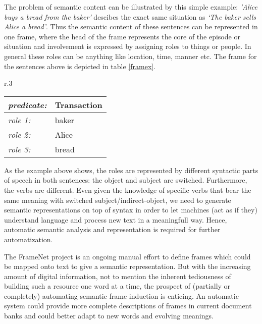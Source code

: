 \documentclass{article} %
\begin{document}
The problem of semantic content can be illustrated by this simple example: \textit{'Alice buys a bread from the baker'} descibes the exact same situation as \textit{`The baker sells Alice a bread'}. Thus the semantic content of these sentences can be represented in one frame, where the head of the frame represents the core of the episode or situation and involvement is expressed by assigning roles to things or people. In general these roles can be anything like location, time, manner etc. The frame for the sentences above is depicted in table \ref{framex}.
\begin{wraptable}{r}{.3\textwidth}
  \centering
\begin{tabular}{|l l|}
  \hline
  \textit{\small predicate:\normalsize}&Transaction\\
  \hline
  \hline
  \textit{\small role 1:\normalsize} &baker\\
  \textit{\small role 2:\normalsize} &Alice\\
  \textit{\small role 3:\normalsize} &bread\\
  \hline
\end{tabular}
\caption{Simple frame}
\label{framex}
\end{wraptable}
As the example above shows, the roles are represented by different syntactic parts of speech in both sentences: the object and subject are switched. Furthermore, the verbs are different. Even given the knowledge of specific verbs that bear the same meaning with switched subject/indirect-object, we need to generate semantic representations on top of syntax in order to let machines (act as if they) understand language and process new text in a meaningfull way. Hence, automatic semantic analysis and representation is required for further automatization.

The FrameNet project \citep{framenet} is an ongoing manual effort to define frames which could be mapped onto text to give a semantic representation. But with the increasing amount of digital information, not to mention the inherent tediousness of building such a resource one word at a time, the prospect of (partially or completely) automating semantic frame induction is enticing. An automatic system could provide more complete descriptions of frames in current document banks and could better adapt to new words and evolving meanings.
\end{document}
